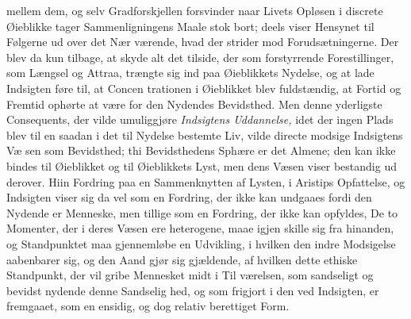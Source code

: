 mellem dem, og selv Gradforskjellen forsvinder naar Livets
Opløsen i discrete Øieblikke tager Sammenligningens Maale\-%
stok bort; deels viser Hensynet til Følgerne ud over det Nær\-%
værende, hvad der strider mod Forudsætningerne. Der blev
da kun tilbage, at skyde alt det tilside, der som forstyrrende
Forestillinger, som Længsel og Attraa, trængte sig ind paa
Øieblikkets Nydelse, og at lade Indsigten føre til, at Concen\-%
trationen i Øieblikket blev fuldstændig, at Fortid og Fremtid
ophørte at være for den Nydendes Bevidsthed. Men denne
yderligste Consequents, der vilde umuliggjøre \emph{Indsigtens
Uddannelse,} idet der ingen Plads blev til en saadan i det
til Nydelse bestemte Liv, vilde directe modsige Indsigtens Væ\-%
sen som Bevidsthed; thi Bevidsthedens Sphære er det Almene;
den kan ikke bindes til Øieblikket og til Øieblikkets Lyst, men
dens Væsen viser bestandig ud derover. Hiin Fordring paa en
Sammenknytten af Lysten, i Aristips Opfattelse, og Indsigten
viser sig da vel som en Fordring, der ikke kan undgaaes fordi
den Nydende er Menneske, men tillige som en Fordring, der
ikke kan opfyldes, De to Momenter, der i deres Væsen ere
heterogene, maae igjen skille sig fra hinanden, og Standpunktet
maa gjennemløbe en Udvikling, i hvilken den indre Modsigelse
aabenbarer sig, og den Aand gjør sig gjældende, af hvilken
dette ethiske Standpunkt, der vil gribe Mennesket midt i Til\-%
værelsen, som sandseligt og bevidst nydende denne Sandselig\-%
hed, og som frigjort i den ved Indsigten, er fremgaaet, som
en ensidig, og dog relativ berettiget Form.

